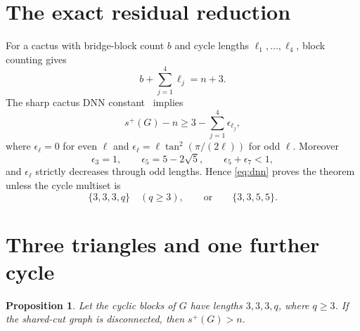 \documentclass[11pt]{article}
\newtheorem{proposition}[theorem]{Proposition}
\newcommand{\spE}{s^+}
\begin{document}
\section{The exact residual reduction}

For a cactus with bridge-block count $b$ and cycle lengths
$\ell_1,\ldots,\ell_4$, block counting gives
\[
 b+\sum_{j=1}^4\ell_j=n+3.
\]
The sharp cactus DNN constant~\cite{DNN,LTZ} implies
\begin{equation}\label{eq:dnn}
 \spE(G)-n\geq3-\sum_{j=1}^4\epsilon_{\ell_j},
\end{equation}
where $\epsilon_\ell=0$ for even $\ell$ and
$\epsilon_\ell=\ell\tan^2(\pi/(2\ell))$ for odd $\ell$.  Moreover
\[
 \epsilon_3=1,\qquad \epsilon_5=5-2\sqrt5,
 \qquad \epsilon_5+\epsilon_7<1,
\]
and $\epsilon_\ell$ strictly decreases through odd lengths.  Hence
\eqref{eq:dnn} proves the theorem unless the cycle multiset is
\begin{equation}\label{eq:residual}
 \{3,3,3,q\}\quad(q\geq3),
 \qquad\text{or}\qquad \{3,3,5,5\}.
\end{equation}

\section{Three triangles and one further cycle}

\begin{proposition}\label{prop:333q}
Let the cyclic blocks of $G$ have lengths $3,3,3,q$, where $q\geq3$.  If
the shared-cut graph is disconnected, then $\spE(G)>n$.
\end{proposition}
\end{document}
